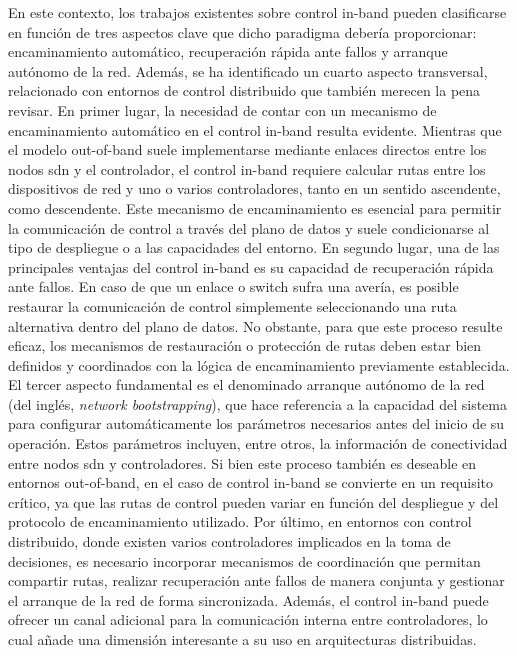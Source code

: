 En este contexto, los trabajos existentes sobre control in-band pueden clasificarse en función de tres aspectos clave que dicho paradigma debería proporcionar: encaminamiento automático, recuperación rápida ante fallos y arranque autónomo de la red. Además, se ha identificado un cuarto aspecto transversal, relacionado con entornos de control distribuido que también merecen la pena revisar. En primer lugar, la necesidad de contar con un mecanismo de encaminamiento automático en el control in-band resulta evidente. Mientras que el modelo out-of-band suele implementarse mediante enlaces directos entre los nodos \gls{sdn} y el controlador, el control in-band requiere calcular rutas entre los dispositivos de red y uno o varios controladores, tanto en un sentido ascendente, como descendente. Este mecanismo de encaminamiento es esencial para permitir la comunicación de control a través del plano de datos y suele condicionarse al tipo de despliegue o a las capacidades del entorno. En segundo lugar, una de las principales ventajas del control in-band es su capacidad de recuperación rápida ante fallos. En caso de que un enlace o switch sufra una avería, es posible restaurar la comunicación de control simplemente seleccionando una ruta alternativa dentro del plano de datos. No obstante, para que este proceso resulte eficaz, los mecanismos de restauración o protección de rutas deben estar bien definidos y coordinados con la lógica de encaminamiento previamente establecida. El tercer aspecto fundamental es el denominado arranque autónomo de la red (del inglés, \textit{network bootstrapping}), que hace referencia a la capacidad del sistema para configurar automáticamente los parámetros necesarios antes del inicio de su operación. Estos parámetros incluyen, entre otros, la información de conectividad entre nodos \gls{sdn} y controladores. Si bien este proceso también es deseable en entornos out-of-band, en el caso de control in-band se convierte en un requisito crítico, ya que las rutas de control pueden variar en función del despliegue y del protocolo de encaminamiento utilizado. Por último, en entornos con control distribuido, donde existen varios controladores implicados en la toma de decisiones, es necesario incorporar mecanismos de coordinación que permitan compartir rutas, realizar recuperación ante fallos de manera conjunta y gestionar el arranque de la red de forma sincronizada. Además, el control in-band puede ofrecer un canal adicional para la comunicación interna entre controladores, lo cual añade una dimensión interesante a su uso en arquitecturas distribuidas.\\
